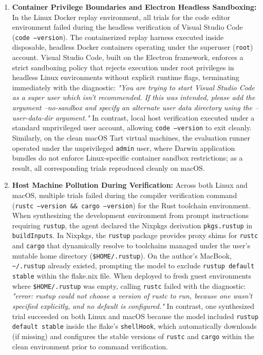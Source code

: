 \begin{enumerate}
	\item \textbf{Container Privilege Boundaries and Electron Headless
		      Sandboxing:} In the Linux Docker replay environment, all trials for the code
	      editor environment failed during the headless verification of Visual Studio
	      Code (\texttt{code --version}). The containerized replay harness executed
	      inside disposable, headless Docker containers operating under the
	      superuser (\texttt{root}) account. Visual Studio Code, built on the Electron
	      framework, enforces a strict sandboxing policy that rejects execution
	      under root privileges in headless Linux environments without explicit
	      runtime flags, terminating immediately with the diagnostic: \textit{"You are
		      trying to start Visual Studio Code as a super user which isn't recommended.
		      If this was intended, please add the argument --no-sandbox and specify an
		      alternate user data directory using the --user-data-dir argument."} In contrast,
	      local host verification executed under a standard unprivileged user
	      account, allowing \texttt{code --version} to exit cleanly. Similarly, on
	      the clean macOS Tart virtual machines, the evaluation runner operated under
	      the unprivileged \texttt{admin} user, where Darwin application bundles do
	      not enforce Linux-specific container sandbox restrictions; as a result, all
	      corresponding trials reproduced cleanly on macOS.

	\item \textbf{Host Machine Pollution During Verification:} Across both Linux
	      and macOS, multiple trials failed during the compiler verification command
	      (\texttt{rustc --version \&\& cargo --version}) for the Rust toolchain
	      environment. When synthesizing the development environment from prompt instructions
	      requiring \texttt{rustup}, the agent declared the Nixpkgs derivation \texttt{pkgs.rustup}
	      in \texttt{buildInputs}. In Nixpkgs, the \texttt{rustup} package
	      provides proxy shims for \texttt{rustc} and \texttt{cargo} that
	      dynamically resolve to toolchains managed under the user's mutable home
	      directory (\texttt{\$HOME/.rustup}). On the author's MacBook, \texttt{\textasciitilde/.rustup}
	      already existed, prompting the model to exclude \texttt{rustup default
		      stable} within the flake.nix file. When deployed to fresh guest environments
	      where \texttt{\$HOME/.rustup} was empty, calling \texttt{rustc} failed
	      with the diagnostic: \textit{"error: rustup could not choose a version
		      of rustc to run, because one wasn't specified explicitly, and no default
		      is configured."} In contrast, one synthesized trial succeeded on both Linux
	      and macOS because the model included \texttt{rustup default stable}
	      inside the flake's \texttt{shellHook}, which automatically downloads (if missing)
	      and configures the stable versions of \texttt{rustc} and \texttt{cargo}
	      within the clean environment prior to command verification.


\end{enumerate}
